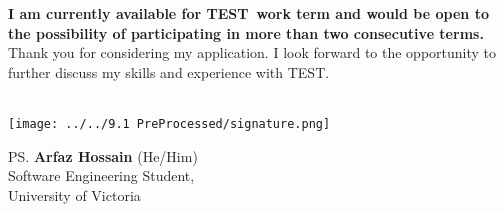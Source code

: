 \documentclass[a4paper, 12pt, oneside]{letter}
\newcommand{\CompanyName}{TEST}
\newcommand{\Terms}{TEST}
\begin{document}
{\fontsize{11}{11.5}\selectfont \bfseries I am currently available for \Terms\ work term and would be open to the possibility of participating in more than two consecutive terms.} Thank you for considering my application. I look forward to the opportunity to further discuss my skills and experience with \CompanyName. \\\\
\vspace{10pt}
\vspace{-25pt}\begin{flushleft}
\hspace*{-1cm}\texttt{[image: ../../9.1 PreProcessed/signature.png]}\vspace{-1cm}
\end{flushleft}
\vspace{-10pt}\ps{\textbf{Arfaz Hossain} (He/Him)\\
Software Engineering Student,\\
University of Victoria} 
\end{document}
